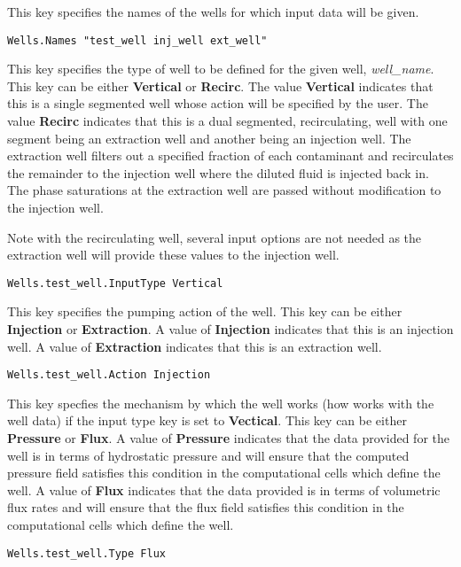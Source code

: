 {
This key specifies the names of the wells for which input data will be
given.
}
\begin{display}\begin{verbatim}
Wells.Names "test_well inj_well ext_well"
\end{verbatim}\end{display}

{
This key specifies the type of well to be defined for the given well, 
{\em well\_name}.  This key can be either {\bf Vertical} or
{\bf Recirc}.  The value {\bf Vertical} indicates that this is a
single segmented well whose action will be specified by the user.
The value {\bf Recirc} indicates that this is a dual segmented,
recirculating, well with one segment being an extraction well and
another being an injection well.  The extraction well filters out a
specified fraction of each contaminant and recirculates the remainder
to the injection well where the diluted fluid is injected back in.  The
phase saturations at the extraction well are passed without modification
to the injection well.

Note with the recirculating well, several input options are not needed
as the extraction well will provide these values to the injection well.
}
\begin{display}\begin{verbatim}
Wells.test_well.InputType Vertical
\end{verbatim}\end{display}

{
This key specifies the pumping action of the well.  This key can be
either {\bf Injection} or {\bf Extraction}.  A value of {\bf Injection}
indicates that this is an injection well.  A value of {\bf Extraction}
indicates that this is an extraction well.
}
\begin{display}\begin{verbatim}
Wells.test_well.Action Injection
\end{verbatim}\end{display}

{
This key specfies the mechanism by which the well works (how \parflow{}
works with the well data) if the input type key is set to {\bf Vectical}.
This key can be either {\bf Pressure} or {\bf Flux}.  A value of
{\bf Pressure} indicates that the data provided for the well is in terms
of hydrostatic pressure and \parflow{} will ensure that the computed
pressure field satisfies this condition in the computational cells which
define the well.  A value of {\bf Flux} indicates that the data provided
is in terms of volumetric flux rates and \parflow{} will ensure that the
flux field satisfies this condition in the computational cells which
define the well.
}
\begin{display}\begin{verbatim}
Wells.test_well.Type Flux
\end{verbatim}\end{display}

